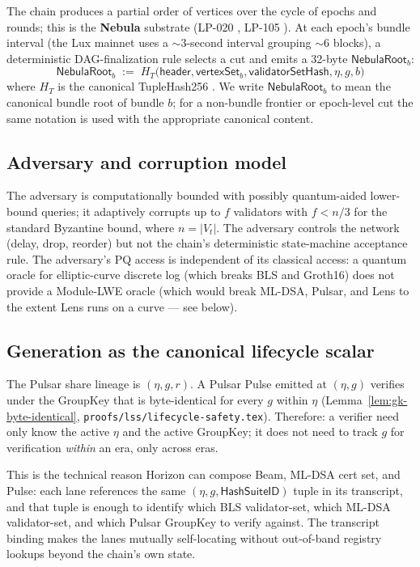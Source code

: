 The chain produces a partial order of vertices over the cycle of epochs and rounds; this is the \textbf{Nebula} substrate (LP-020 \cite{lp020}, LP-105 \cite{lp105}). At each epoch's bundle interval (the Lux mainnet uses a $\sim 3$-second interval grouping $\sim 6$ blocks), a deterministic DAG-finalization rule selects a cut and emits a 32-byte $\mathsf{NebulaRoot}_b$:
\begin{equation}
  \mathsf{NebulaRoot}_b \;:=\; H_T\bigl(\mathsf{header}, \mathsf{vertexSet}_b, \mathsf{validatorSetHash}, \eta, g, b\bigr)
\end{equation}
where $H_T$ is the canonical TupleHash256 \cite{nistsp800185}. We write $\mathsf{NebulaRoot}_b$ to mean the canonical bundle root of bundle $b$; for a non-bundle frontier or epoch-level cut the same notation is used with the appropriate canonical content.

\subsection{Adversary and corruption model}

The adversary is computationally bounded with possibly quantum-aided lower-bound queries; it adaptively corrupts up to $f$ validators with $f < n/3$ for the standard Byzantine bound, where $n = |V_t|$. The adversary controls the network (delay, drop, reorder) but not the chain's deterministic state-machine acceptance rule. The adversary's PQ access is independent of its classical access: a quantum oracle for elliptic-curve discrete log (which breaks BLS and Groth16) does not provide a Module-LWE oracle (which would break ML-DSA, Pulsar, and Lens to the extent Lens runs on a curve --- see below).

\subsection{Generation as the canonical lifecycle scalar}

The Pulsar share lineage is $(\eta, g, r)$. A Pulsar Pulse emitted at $(\eta, g)$ verifies under the GroupKey that is byte-identical for every $g$ within $\eta$ (Lemma~\ref{lem:gk-byte-identical}, \texttt{proofs/lss/lifecycle-safety.tex}). Therefore: a verifier need only know the active $\eta$ and the active GroupKey; it does not need to track $g$ for verification \emph{within} an era, only across eras.

This is the technical reason Horizon can compose Beam, ML-DSA cert set, and Pulse: each lane references the same $(\eta, g, \mathsf{HashSuiteID})$ tuple in its transcript, and that tuple is enough to identify which BLS validator-set, which ML-DSA validator-set, and which Pulsar GroupKey to verify against. The transcript binding makes the lanes mutually self-locating without out-of-band registry lookups beyond the chain's own state.


